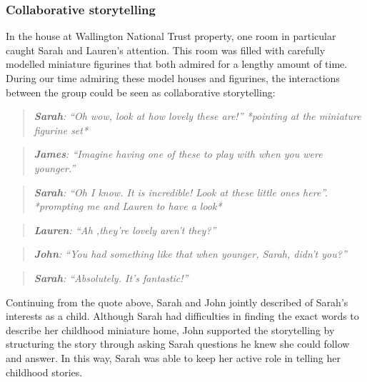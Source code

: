 \subsubsection{Collaborative storytelling}
\label{CollabStorytelling}
In the house at Wallington National Trust property, one room in particular caught Sarah and Lauren's attention. This room was filled with carefully modelled miniature figurines that both admired for a lengthy amount of time. During our time admiring these model houses and figurines, the interactions between the group could be seen as collaborative storytelling:
\begin{quote}
   \textit{\textbf{ Sarah}: ``Oh wow, look at how lovely these are!''
   *pointing at the miniature figurine set*}
\end{quote}

\begin{quote}
    \textit{\textbf{James}:  ``Imagine having one of these to play with when you were younger.''}
\end{quote}

\begin{quote}
\textit{    \textbf{Sarah}: ``Oh I know. It is incredible! Look at these little ones here''. *prompting me and Lauren to have a look*}

\end{quote}

\begin{quote}
\textit{    \textbf{Lauren}: ``Ah ,they're lovely aren't they?''
}
\end{quote}

\begin{quote}
\textit{    \textbf{John}: ``You had something like that when younger, Sarah, didn't you?''
}
\end{quote}

\begin{quote}
\textit{    \textbf{Sarah}: ``Absolutely. It's fantastic!''
}
\end{quote}

Continuing from the quote above, Sarah and John jointly described of Sarah's interests as a child. Although Sarah had difficulties in finding the exact words to describe her childhood miniature home, John supported the storytelling by structuring the story through asking Sarah questions he knew she could follow and answer. In this way, Sarah was able to keep her active role in telling her childhood stories.



